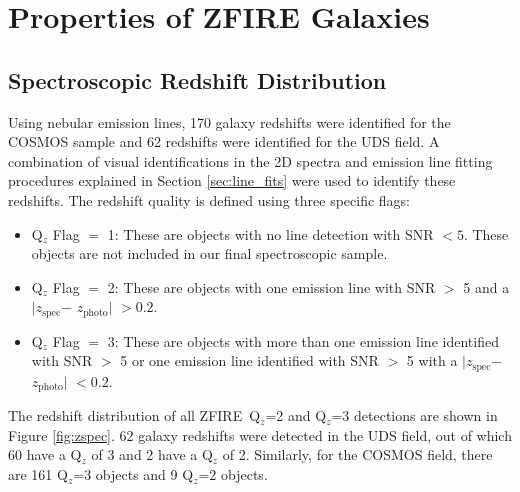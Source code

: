 \documentclass[iop]{emulateapj}
\newcommand{\zspec}{$z_{\mathrm{spec}}$}
\newcommand{\zphoto}{$z_{\mathrm{photo}}$}
\begin{document}

\section{Properties of ZFIRE Galaxies}
\label{sec:results}

\subsection{Spectroscopic Redshift Distribution}
\label{sec:Q flags}

Using nebular emission lines, 170 galaxy redshifts were identified for the COSMOS sample and 62 redshifts were identified for the UDS field. 
A combination of visual identifications in the 2D spectra and emission line fitting procedures explained in Section \ref{sec:line_fits} were used to identify these redshifts. 
The redshift quality is defined using three specific flags: 
\begin{itemize}
\item Q$_z$ Flag $=$ 1: These are objects with no line detection with SNR $<5$. These objects are not included in our final spectroscopic sample. 
\item Q$_z$ Flag $=$ 2: These are objects with one emission line with SNR $>$ 5 and a $|$\zspec $-$ \zphoto $|$ $> 0.2$.
\item Q$_z$ Flag $=$ 3: These are objects with more than one emission line identified with SNR $>$ 5 or one  emission line identified with SNR $>$ 5 with a $|$\zspec $-$ \zphoto $|$ $< 0.2$.
\end{itemize}

 
The redshift distribution of all ZFIRE\ Q$_z$=2 and Q$_z$=3 detections are shown in Figure \ref{fig:zspec}. 62 galaxy redshifts were detected in the UDS field, out of which 60 have a Q$_z$ of 3 and 2 have a Q$_z$ of 2. Similarly, for the COSMOS field, there are 161  Q$_z$=3 objects and 9 Q$_z$=2 objects. 
\end{document}
